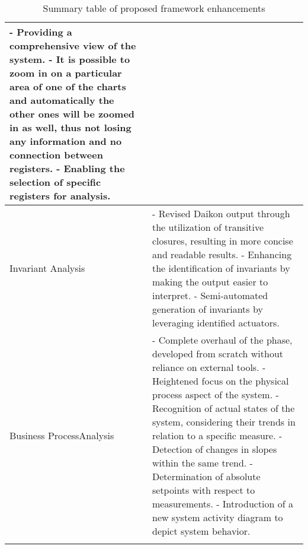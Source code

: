 {\begin{longtable}[c]{p{} p{}}
		- Providing a comprehensive view of the system.\newline 
		- It is possible to zoom in on a particular area of one of the charts and automatically the other ones will be zoomed in as well, thus not losing any information and no connection between registers.\newline
		- Enabling the selection of speciﬁc registers for analysis.\\
		\hline
		Invariant Analysis & - Revised Daikon output through the utilization of transitive closures, resulting in more concise and readable results.\newline
		- Enhancing the identification of invariants by making the output easier to interpret.\newline
		- Semi-automated generation of invariants by leveraging identiﬁed actuators.\\
		\hline
		Business Process\newline Analysis & - Complete overhaul of the phase, developed from scratch without reliance on external tools.\newline
		- Heightened focus on the physical process aspect of the system.\newline
		- Recognition of actual states of the system, considering their trends in relation to a specific measure.\newline
		- Detection of changes in slopes within the same trend.\newline
		- Determination of absolute setpoints with respect to measurements.\newline
		- Introduction of a new system activity diagram to depict system behavior. \\
		\hline
		
		\caption{Summary table of proposed framework enhancements}
		\label{table:4_proposed_framework_summarize}
	\end{longtable}
}

\vfill

